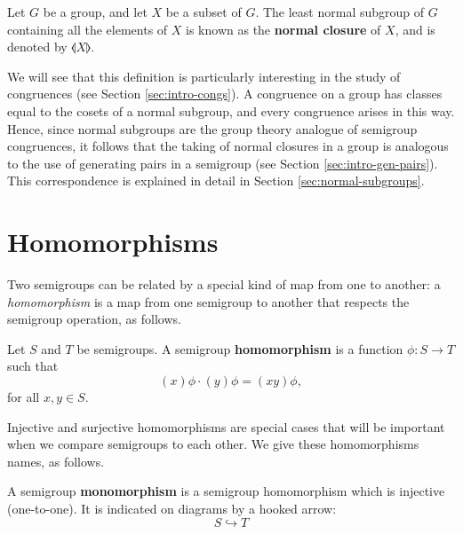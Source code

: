 \begin{definition}
  \label{def:normal-closure}
  Let $G$ be a group, and let $X$ be a subset of $G$.  The least normal subgroup
  of $G$ containing all the elements of $X$ is known as the \textbf{normal
    closure} of $X$, and is denoted by $\llangle X \rrangle$.
\end{definition}

We will see that this definition is particularly interesting in the study of
congruences (see Section \ref{sec:intro-congs}).  A congruence on a group has
classes equal to the cosets of a normal subgroup, and every congruence arises in
this way.  Hence, since normal subgroups are the group theory analogue of
semigroup congruences, it follows that the taking of normal closures in a group
is analogous to the use of generating pairs in a semigroup (see Section
\ref{sec:intro-gen-pairs}).  This correspondence is explained in detail in
Section \ref{sec:normal-subgroups}.

\section{Homomorphisms}
\label{sec:homomorphisms}

Two semigroups can be related by a special kind of map from one to another: a
\textit{homomorphism} is a map from one semigroup to another that respects the
semigroup operation, as follows.

\begin{definition}
  \label{def:homomorphism}
  Let $S$ and $T$ be semigroups.  A semigroup \textbf{homomorphism} is a
  function $\phi: S \to T$ such that
  $$(x)\phi \cdot (y)\phi = (xy)\phi,$$
  for all $x, y \in S$.
\end{definition}

Injective and surjective homomorphisms are special cases that will be important
when we compare semigroups to each other.  We give these homomorphisms names, as
follows.

\begin{definition}
  \label{def:monomorphism}
  A semigroup \textbf{monomorphism} is a semigroup homomorphism which is
  injective (one-to-one).  It is indicated on diagrams by a hooked arrow:
  $$S \hookrightarrow T$$
\end{definition}

